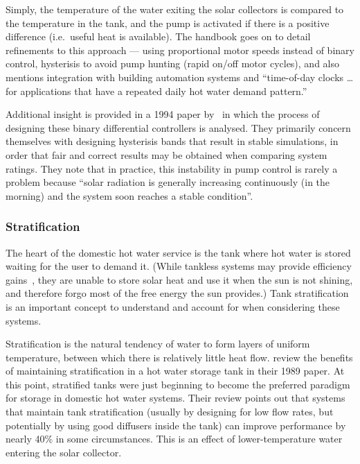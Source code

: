 Simply, the temperature of the water exiting the solar collectors is compared to the temperature in the tank, and the pump is activated if there is a positive difference (i.e.\ useful heat is available).
The handbook goes on to detail refinements to this approach --- using proportional motor speeds instead of binary control, hysterisis to avoid pump hunting (rapid on/off motor cycles), and also mentions integration with building automation systems and ``time-of-day clocks \ldots for applications that have a repeated daily hot water demand pattern.''

Additional insight is provided in a 1994 paper by~\textcite{Beckman94} in which the process of designing these binary differential controllers is analysed.
They primarily concern themselves with designing hysterisis bands that result in stable simulations, in order that fair and correct results may be obtained when comparing system ratings.
They note that in practice, this instability in pump control is rarely a problem because ``solar radiation is generally increasing continuously (in the morning) and the system soon reaches a stable condition''.

\subsubsection{Stratification}
\label{sec:background:stratification}

The heart of the domestic hot water service is the tank where hot water is stored waiting for the user to demand it.
(While tankless systems may provide efficiency gains~\cite{DuffBradnum13}, they are unable to store solar heat and use it when the sun is not shining, and therefore forgo most of the free energy the sun provides.)
Tank stratification is an important concept to understand and account for when considering these systems.

Stratification is the natural tendency of water to form layers of uniform temperature, between which there is relatively little heat flow.
\textcite{Hollands89} review the benefits of maintaining stratification in a hot water storage tank in their 1989 paper.
At this point, stratified tanks were just beginning to become the preferred paradigm for storage in domestic hot water systems.
Their review points out that systems that maintain tank stratification (usually by designing for low flow rates, but potentially by using good diffusers inside the tank) can improve performance by nearly 40\% in some circumstances.
This is an effect of lower-temperature water entering the solar collector.

